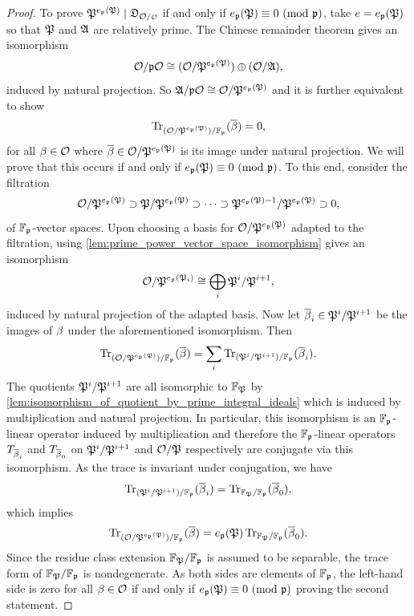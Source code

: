 \begin{proof}
      To prove \(\mf{P}^{e_{\mf{p}}(\mf{P})} \mid \mf{D}_{\mc{O}/\smc{O}}\) if and only if \(e_{\mathfrak{p}}(\mathfrak{P}) \equiv 0 \ (\mathrm{mod}\text{ }\mathfrak{p})\), take \(e = e_{\mathfrak{p}}(\mathfrak{P})\) so that \(\mathfrak{P}\) and \(\mathfrak{A}\) are relatively prime. The Chinese remainder theorem gives an isomorphism
      \[
        \mathcal{O}/\mathfrak{p}\mathcal{O} \cong (\mathcal{O}/\mathfrak{P}^{e_{\mathfrak{p}}(\mathfrak{P})}) \oplus (\mathcal{O}/\mathfrak{A}),
      \]
      induced by natural projection. So \(\mathfrak{A}/\mathfrak{p}\mathcal{O} \cong \mathcal{O}/\mathfrak{P}^{e_{\mathfrak{p}}(\mathfrak{P})}\) and it is further equivalent to show
      \[
        \operatorname{\mathrm{Tr}}_{(\mathcal{O}/\mathfrak{P}^{e_{\mathfrak{p}}(\mathfrak{P})})/\mathbb{F}_{\mathfrak{p}}}(\overline{\beta}) = 0,
      \]
      for all \(\beta \in \mathcal{O}\) where \(\overline{\beta} \in \mathcal{O}/\mathfrak{P}^{e_{\mathfrak{p}}(\mathfrak{P})}\) is its image under natural projection. We will prove that this occurs if and only if \(e_{\mathfrak{p}}(\mathfrak{P}) \equiv 0 \ (\mathrm{mod}\text{ }\mathfrak{p})\). To this end, consider the filtration
      \[
        \mathcal{O}/\mathfrak{P}^{e_{\mathfrak{p}}(\mathfrak{P})} \supset \mathfrak{P}/\mathfrak{P}^{e_{\mathfrak{p}}(\mathfrak{P})} \supset \cdots \supset \mathfrak{P}^{e_{\mathfrak{p}}(\mathfrak{P})-1}/\mathfrak{P}^{e_{\mathfrak{p}}(\mathfrak{P})} \supset 0,
      \]
      of \(\mathbb{F}_{\mathfrak{p}}\)-vector spaces. Upon choosing a basis for \(\mathcal{O}/\mathfrak{P}^{e_{\mathfrak{p}}(\mathfrak{P})}\) adapted to the filtration, using \cref{lem:prime_power_vector_space_isomorphism} gives an isomorphism
      \[
        \mathcal{O}/\mathfrak{P}^{e_{\mathfrak{p}}(\mathfrak{P}_{i})} \cong \bigoplus_{i}\mathfrak{P}^{i}/\mathfrak{P}^{i+1},
      \]
      induced by natural projection of the adapted basis. Now let \(\overline{\beta}_{i} \in \mathfrak{P}^{i}/\mathfrak{P}^{i+1}\) be the images of \(\beta\) under the aforementioned isomorphism. Then
      \[
        \operatorname{\mathrm{Tr}}_{(\mathcal{O}/\mathfrak{P}^{e_{\mathfrak{p}}(\mathfrak{P})})/\mathbb{F}_{\mathfrak{p}}}(\overline{\beta}) = \sum_{i}\operatorname{\mathrm{Tr}}_{(\mathfrak{P}^{i}/\mathfrak{P}^{i+1})/\mathbb{F}_{\mathfrak{p}}}(\overline{\beta}_{i}).
      \]
      The quotients \(\mathfrak{P}^{i}/\mathfrak{P}^{i+1}\) are all isomorphic to \(\mathbb{F}_{\mathfrak{P}}\) by \cref{lem:isomorphism_of_quotient_by_prime_integral_ideals} which is induced by multiplication and natural projection. In particular, this isomorphism is an \(\mathbb{F}_{\mathfrak{p}}\)-linear operator induced by multiplication and therefore the \(\mathbb{F}_{\mathfrak{p}}\)-linear operators \(T_{\overline{\beta}_{i}}\) and \(T_{\overline{\beta}_{0}}\) on \(\mathfrak{P}^{i}/\mathfrak{P}^{i+1}\) and \(\mathcal{O}/\mathfrak{P}\) respectively are conjugate via this isomorphism. As the trace is invariant under conjugation, we have
      \[
        \operatorname{\mathrm{Tr}}_{(\mathfrak{P}^{i}/\mathfrak{P}^{i+1})/\mathbb{F}_{\mathfrak{p}}}(\overline{\beta}_{i}) = \operatorname{\mathrm{Tr}}_{\mathbb{F}_{\mathfrak{P}}/\mathbb{F}_{\mathfrak{p}}}(\overline{\beta}_{0}),
      \]
      which implies
      \[
        \operatorname{\mathrm{Tr}}_{(\mathcal{O}/\mathfrak{P}^{e_{\mathfrak{p}}(\mathfrak{P})})/\mathbb{F}_{\mathfrak{p}}}(\overline{\beta}) = e_{\mathfrak{p}}(\mathfrak{P})\operatorname{\mathrm{Tr}}_{\mathbb{F}_{\mathfrak{P}}/\mathbb{F}_{\mathfrak{p}}}(\overline{\beta}_{0}).
      \]
      Since the residue class extension \(\mathbb{F}_{\mathfrak{P}}/\mathbb{F}_{\mathfrak{p}}\) is assumed to be separable, the trace form of \(\mathbb{F}_{\mathfrak{P}}/\mathbb{F}_{\mathfrak{p}}\) is nondegenerate. As both sides are elements of \(\mathbb{F}_{\mathfrak{p}}\), the left-hand side is zero for all \(\beta \in \mathcal{O}\) if and only if \(e_{\mathfrak{p}}(\mathfrak{P}) \equiv 0 \ (\mathrm{mod}\text{ }\mathfrak{p})\) proving the second statement.


\end{proof}

